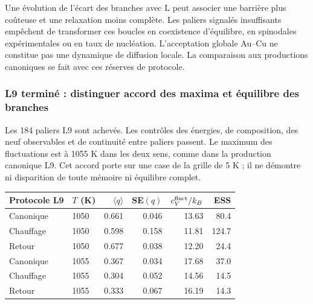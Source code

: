 Une évolution de l’écart des branches avec L peut associer une barrière plus coûteuse et une relaxation moins complète. Les paliers signalés insuffisants empêchent de transformer ces boucles en coexistence d’équilibre, en spinodales expérimentales ou en taux de nucléation. L’acceptation globale Au--Cu ne constitue pas une dynamique de diffusion locale. La comparaison aux productions canoniques se fait avec ces réserves de protocole.


\subsubsection{L9 terminé : distinguer accord des maxima et équilibre des branches}

Les 184 paliers L9 sont achevés. Les contrôles des énergies, de composition, des neuf observables et de continuité entre paliers passent. Le maximum des fluctuations est à 1055 K dans les deux sens, comme dans la production canonique L9. Cet accord porte sur une case de la grille de 5 K ; il ne démontre ni disparition de toute mémoire ni équilibre complet.


\begin{center}\small\begin{tabular}{llrrrr}\toprule

Protocole L9 & $T$ (K) & $\langle q\rangle$ & SE$(q)$ & $c_V^{\rm fluct}/k_B$ & ESS\\\midrule

Canonique & 1050 & 0.661 & 0.046 & 13.63 & 80.4\\

Chauffage & 1050 & 0.598 & 0.158 & 11.81 & 124.7\\

Retour & 1050 & 0.677 & 0.038 & 12.20 & 24.4\\

Canonique & 1055 & 0.367 & 0.034 & 17.68 & 37.0\\

Chauffage & 1055 & 0.304 & 0.052 & 14.56 & 14.5\\

Retour & 1055 & 0.333 & 0.067 & 16.19 & 14.3\\

\bottomrule\end{tabular}\end{center}

